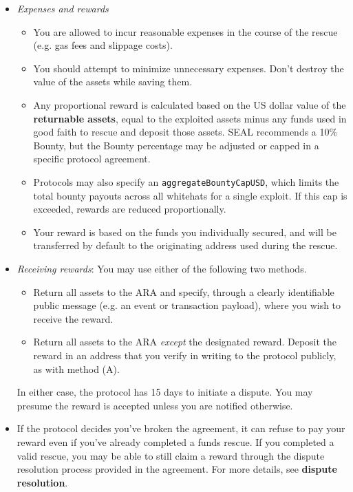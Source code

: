 \documentclass{article}
\begin{document}
\begin{itemize}
    \item \textit{Expenses and rewards}
          \begin{itemize}
              \item You are allowed to incur reasonable expenses in the course of the rescue (e.g. gas fees and slippage costs).
              \item You should attempt to minimize unnecessary expenses. Don't destroy the value of the assets while saving them.
              \item Any proportional reward is calculated based on the US dollar value of the \textbf{returnable assets}, equal to the exploited assets minus any funds used in good faith to rescue and deposit those assets. SEAL recommends a 10\% Bounty, but the Bounty percentage may be adjusted or capped in a specific protocol agreement.
              \item Protocols may also specify an \texttt{aggregateBountyCapUSD}, which limits the total bounty payouts across all whitehats for a single exploit. If this cap is exceeded, rewards are reduced proportionally.
              \item Your reward is based on the funds you individually secured, and will be transferred by default to the originating address used during the rescue.
          \end{itemize}

    \item \textit{Receiving rewards}: You may use either of the following two methods.
          \begin{itemize}
              \item Return all assets to the ARA and specify, through a clearly identifiable public message (e.g. an event or transaction payload), where you wish to receive the reward.
              \item Return all assets to the ARA \textit{except} the designated reward. Deposit the reward in an address that you verify in writing to the protocol publicly, as with method (A).
          \end{itemize}
          In either case, the protocol has 15 days to initiate a dispute. You may presume the reward is accepted unless you are notified otherwise.

    \item If the protocol decides you've broken the agreement, it can refuse to pay your reward even if you've already completed a funds rescue. If you completed a valid rescue, you may be able to still claim a reward through the dispute resolution process provided in the agreement. For more details, see \textbf{dispute resolution}.
\end{itemize}
\end{document}
